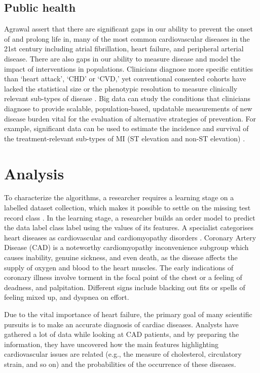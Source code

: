 \documentclass[sigconf]{acmart}
\begin{document}
\subsection{Public health}
Agrawal \cite{agrawal1993mining} assert that there are significant gaps in our ability to prevent the onset of and prolong life in, many of the most common cardiovascular diseases in the 21st century including atrial fibrillation, heart failure, and peripheral arterial disease.
There are also gaps in our ability to measure disease and model the impact of interventions in populations.
Clinicians diagnose more specific entities than `heart attack', `CHD' or `CVD,' yet conventional consented cohorts have lacked the statistical size or the phenotypic resolution to measure clinically relevant sub-types of disease \cite{chu2009bayesian}.
Big data can study the conditions that clinicians diagnose to provide scalable, population-based, updatable measurements of new disease burden vital for the evaluation of alternative strategies of prevention.
For example, significant data can be used to estimate the incidence and survival of the treatment-relevant sub-types of MI (ST elevation and non-ST elevation) \cite{dietterich2000ensemble}.

\section{Analysis}
To characterize the algorithms, a researcher requires a learning stage on a labelled dataset collection, which makes it possible to settle on the missing test record class \cite{ali}.
In the learning stage, a researcher builds an order model to predict the data label class label using the values of its features.
A specialist categorises heart diseases as cardiovascular and cardiomyopathy disorders \cite{ali}.
Coronary Artery Disease (CAD) is a noteworthy cardiomyopathy inconvenience subgroup which causes inability, genuine sickness, and even death, as the disease affects the supply of  oxygen and blood to the heart muscles.
The early indications of coronary illness involve torment in the focal point of the chest or a feeling of deadness, and palpitation.
Different signs include blacking out fits or spells of feeling mixed up, and dyspnea on effort.
\par  Due to the vital importance of heart failure, the primary goal of many scientific pursuits is to make an accurate diagnosis of cardiac diseases.
Analysts have gathered a lot of data while looking at CAD patients, and by preparing the information, they have uncovered how the main features highlighting cardiovascular issues are related (e.g., the measure of cholesterol, circulatory strain, and so on) and the probabilities of the occurrence of these diseases.
\end{document}
